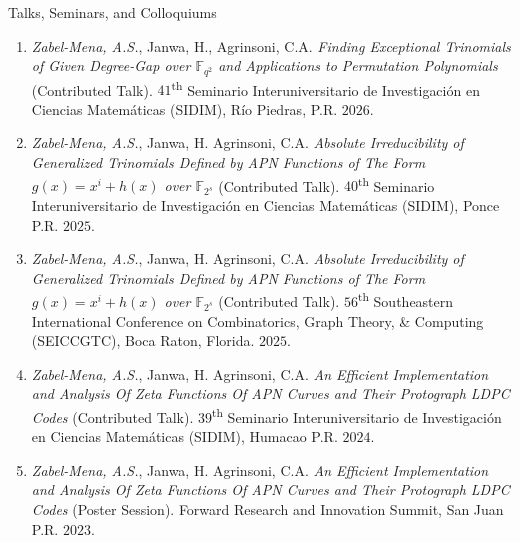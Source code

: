 \documentclass{resume}
\begin{document}
\begin{rSection}{Talks, Seminars, and Colloquiums}
  \begin{enumerate}

    \item \textit{Zabel-Mena, A.S.}, Janwa, H., Agrinsoni, C.A.
      \textit{Finding Exceptional Trinomials of Given Degree-Gap
        over $\mathbb{F}_{q^2}$ and Applications to Permutation
      Polynomials} (Contributed Talk).
      $41$\textsuperscript{th}  Seminario Interuniversitario de
      Investigaci\'on en Ciencias Matem\'aticas (SIDIM), R\'io
      Piedras, P.R. $2026$.

    \item \textit{Zabel-Mena, A.S.}, Janwa, H. Agrinsoni, C.A.
      \textit{Absolute Irreducibility of Generalized
        Trinomials Defined by APN Functions of The Form
      $g(x)=x^{i}+h(x)$ over $\mathbb{F}_{2^s}$} (Contributed Talk).
      $40$\textsuperscript{th} Seminario Interuniversitario de
      Investigaci\'on en Ciencias Matem\'aticas (SIDIM), Ponce P.R.
      $2025$.

    \item \textit{Zabel-Mena, A.S.}, Janwa, H. Agrinsoni, C.A.
      \textit{Absolute Irreducibility of Generalized
        Trinomials Defined by APN Functions of The Form
      $g(x)=x^{i}+h(x)$ over $\mathbb{F}_{2^s}$} (Contributed Talk).
      $56$\textsuperscript{th} Southeastern International Conference
      on Combinatorics, Graph Theory, \& Computing (SEICCGTC), Boca
      Raton, Florida. $2025$.

    \item \textit{Zabel-Mena, A.S.}, Janwa, H. Agrinsoni, C.A.
      \textit{An Efficient Implementation and Analysis Of Zeta
      Functions Of APN Curves and Their Protograph LDPC Codes}
      (Contributed Talk). $39$\textsuperscript{th} Seminario
      Interuniversitario de Investigaci\'on en Ciencias Matem\'aticas
      (SIDIM), Humacao P.R. $2024$.

    \item \textit{Zabel-Mena, A.S.}, Janwa, H. Agrinsoni, C.A.
      \textit{An Efficient Implementation and Analysis Of Zeta
      Functions Of APN Curves and Their Protograph LDPC Codes}
      (Poster Session). Forward Research and Innovation Summit, San
      Juan P.R. $2023$.
  \end{enumerate}
\end{rSection}

\pagebreak
\end{document}
